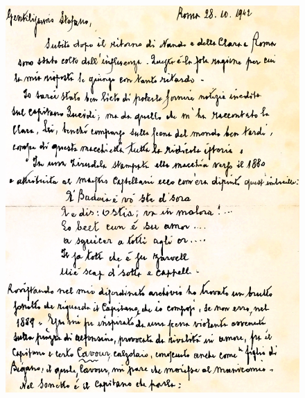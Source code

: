  \begin{figure}[htb]
    \centering
    \includegraphics[width=\textwidth]{lettera}
    \caption[Lettera di Ugo De Maria]{}
\end{figure}

